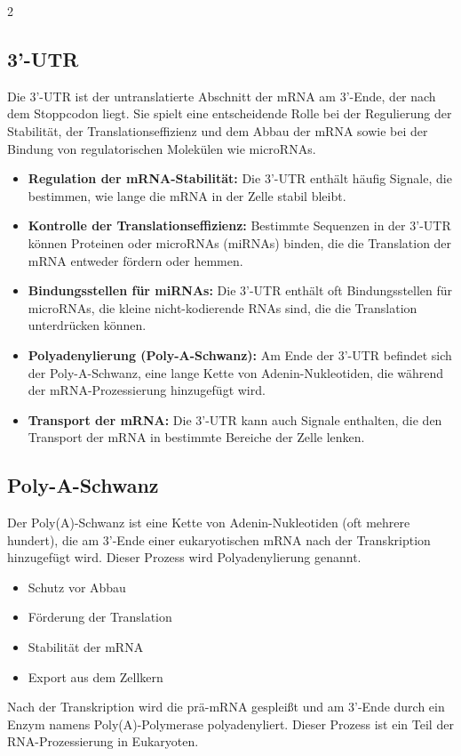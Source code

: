\documentclass{article}
\begin{document}
\begin{multicols}{2}
\subsection{3'-UTR}
\begin{mybox}[title=3'-untranslated region]
Die 3'-UTR ist der untranslatierte Abschnitt der mRNA am 3'-Ende, der nach dem Stoppcodon liegt. Sie spielt eine entscheidende Rolle bei der Regulierung der Stabilität, der Translationseffizienz und dem Abbau der mRNA sowie bei der Bindung von regulatorischen Molekülen wie microRNAs.
\end{mybox}
\begin{itemize}
    \item \textbf{Regulation der mRNA-Stabilität:} Die 3'-UTR enthält häufig Signale, die bestimmen, wie lange die mRNA in der Zelle stabil bleibt.
    \item \textbf{Kontrolle der Translationseffizienz:} Bestimmte Sequenzen in der 3'-UTR können Proteinen oder microRNAs (miRNAs) binden, die die Translation der mRNA entweder fördern oder hemmen. 
    \item \textbf{Bindungsstellen für miRNAs:} Die 3'-UTR enthält oft Bindungsstellen für microRNAs, die kleine nicht-kodierende RNAs sind, die die Translation unterdrücken können. 
    \item \textbf{Polyadenylierung (Poly-A-Schwanz):} Am Ende der 3'-UTR befindet sich der Poly-A-Schwanz, eine lange Kette von Adenin-Nukleotiden, die während der mRNA-Prozessierung hinzugefügt wird.   
    \item \textbf{Transport der mRNA:} Die 3'-UTR kann auch Signale enthalten, die den Transport der mRNA in bestimmte Bereiche der Zelle lenken. 
\end{itemize}
\subsection{Poly-A-Schwanz}
\begin{mybox}[title=Poly-A-Schwanz]
Der Poly(A)-Schwanz ist eine Kette von Adenin-Nukleotiden (oft mehrere hundert), die am 3'-Ende einer eukaryotischen mRNA nach der Transkription hinzugefügt wird. Dieser Prozess wird Polyadenylierung genannt.
\end{mybox}
\begin{itemize}
    \item Schutz vor Abbau
    \item Förderung der Translation
    \item Stabilität der mRNA
    \item Export aus dem Zellkern
\end{itemize}
\begin{mechanism}[title=Polyadenylierungsprozess]
 Nach der Transkription wird die prä-mRNA gespleißt und am 3'-Ende durch ein Enzym namens Poly(A)-Polymerase polyadenyliert. Dieser Prozess ist ein Teil der RNA-Prozessierung in Eukaryoten.
\end{mechanism}

\end{multicols}
\end{document}
